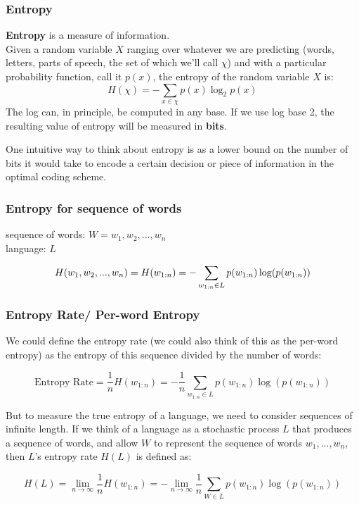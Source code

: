 \subsubsection{Entropy}\label{Entropy}
\textbf{Entropy} is a measure of information.\\
Given a random variable $X$ ranging over whatever we are predicting (words, letters, parts of speech, the set of which we’ll call $\chi$) and with a particular probability function, call it $p(x)$, the entropy of the random variable $X$ is:
\[
    \displaystyle H(\chi) = - \sum_{x \in \chi} p(x)\log_2p(x)
\]
The log can, in principle, be computed in any base. If we use log base 2, the
resulting value of entropy will be measured in \textbf{bits}.

One intuitive way to think about entropy is as a lower bound on the number of bits it would take to encode a certain decision or piece of information in the optimal coding scheme.

\subsubsection{Entropy for sequence of words}\label{Entropy for sequence of words}
sequence of words: $W = {w_1,w_2,...,w_n}$\\
language: $L$

\[
    H(w_1,w_2,...,w_n) = H(w_{1:n}) = -\displaystyle\sum_{w_{1:n}\in L} p(w_{1:n})\log(p(w_{1:n}))
\]

\subsubsection{Entropy Rate/ Per-word Entropy}
We could define the entropy rate (we could also think of this as the per-word entropy) as the entropy of this sequence divided by the number of words:

\[
    \text{Entropy Rate} = \dfrac{1}{n}H(w_{1:n}) = -\dfrac{1}{n}\sum_{w_{1:n}\in L} p(w_{1:n})\log(p(w_{1:n}))
\]

But to measure the true entropy of a language, we need to consider sequences of infinite length. If we think of a language as a stochastic process $L$ that produces a sequence of words, and allow $W$ to represent the sequence of words $w_1,...,w_n$, then $L$’s entropy rate $H(L)$ is defined as:

\[
    H(L) = \lim_{n \rightarrow \infty} \dfrac{1}{n}H(w_{1:n}) = -\lim_{n \rightarrow \infty} \dfrac{1}{n}\sum_{W \in L} p(w_{1:n})\log(p(w_{1:n}))
\]

